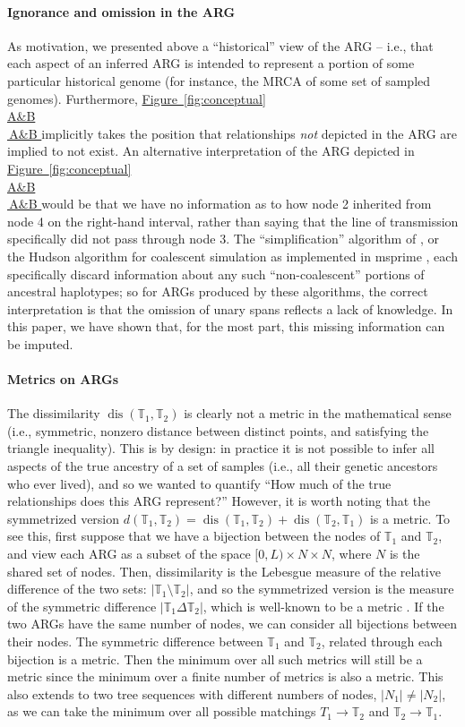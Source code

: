 \documentclass[10pt,twoside,lineno]{gsajnl}
\newcommand{\T}{\mathbb{T}}
\newcommand{\dis}{\operatorname{dis}}
\newcommand*{\figref}[2][]{%
	\hyperref[{#2}]{%
		Figure~\ref*{#2}%
		\ifx\\#1\\%
		\else
		\,#1%
		\fi
	}%
}
\begin{document}
\paragraph{Ignorance and omission in the ARG}
As motivation, we presented above a ``historical'' view of the ARG --
i.e., that each aspect of an inferred ARG is intended to represent
a portion of some particular historical genome
(for instance, the MRCA of some set of sampled genomes).
Furthermore, \figref[A\&B]{fig:conceptual} implicitly takes the position
that relationships \emph{not} depicted in the ARG are implied to not exist.
An alternative interpretation
of the ARG depicted in \figref[A\&B]{fig:conceptual} would be that we have no information as to 
how node 2 inherited from node 4 on the right-hand interval,
rather than saying that the line of transmission specifically did not pass
through node 3.
The ``simplification'' algorithm of \citet{kelleher2018efficient},
or the Hudson algorithm for coalescent simulation
as implemented in msprime \citep{kelleher2016efficient},
each specifically discard information about any such ``non-coalescent'' portions of ancestral haplotypes;
so for ARGs produced by these algorithms, the correct interpretation is that
the omission of unary spans reflects a lack of knowledge.
In this paper, we have shown that, for the most part, this missing information can be imputed.

\paragraph{Metrics on ARGs}
The dissimilarity $\dis(\T_1,\T_2)$ is clearly not a metric in the mathematical sense
(i.e., symmetric, nonzero distance between distinct points, and satisfying the triangle inequality).
This is by design: in practice it is not possible to infer all aspects
of the true ancestry of a set of samples (i.e., all their genetic ancestors who ever lived),
and so we wanted to quantify
``How much of the true relationships does this ARG represent?''
However, it is worth noting that the symmetrized version
$d(\T_1,\T_2) = \dis(\T_1,\T_2) + \dis(\T_2, \T_1)$ is a metric.
To see this, first suppose that we have a bijection between the nodes of $\T_1$ and $\T_2$,
and view each ARG as a subset of the space $[0,L) \times N \times N$,
where $N$ is the shared set of nodes.
Then, dissimilarity is the Lebesgue measure of the relative difference of the two sets:
$|\T_1 \setminus \T_2|$,
and so the symmetrized version is the measure of the symmetric difference
$|\T_1\Delta\T_2|$,
which is well-known to be a metric \citep{rudin1976principles}. 
If the two ARGs have the same number of nodes,
we can consider all bijections between their nodes.
The symmetric difference between $\T_1$ and $\T_2$,
related through each bijection is a metric.
Then the minimum over all such metrics will still be a metric
since the minimum over a finite number of metrics is also a metric.
This also extends to two tree sequences with different numbers of nodes, $|N_1|\neq|N_2|$, as we can take the minimum over all possible matchings $T_1\to\T_2$ and $\T_2\to\T_1$.
\end{document}

